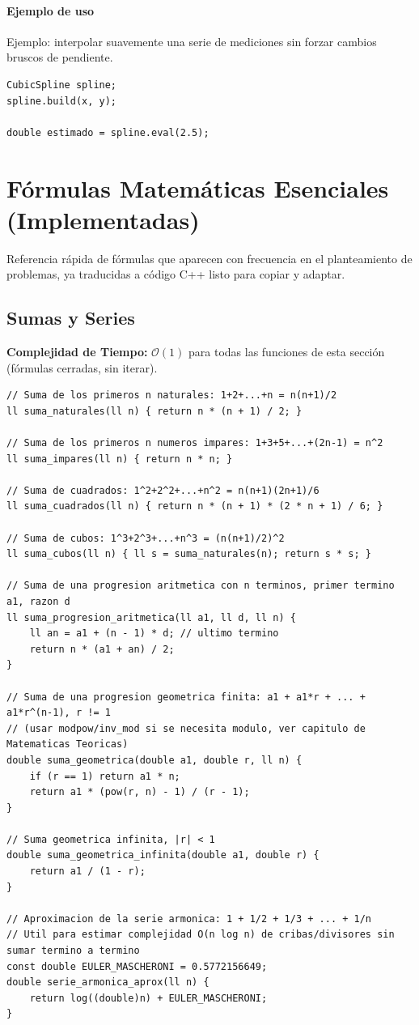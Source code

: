 \documentclass[10pt,twocolumn,letterpaper]{report}
\begin{document}
\subsubsection*{Ejemplo de uso}
Ejemplo: interpolar suavemente una serie de mediciones sin forzar cambios bruscos de pendiente.
\begin{lstlisting}
CubicSpline spline;
spline.build(x, y);

double estimado = spline.eval(2.5);
\end{lstlisting}

\chapter{Fórmulas Matemáticas Esenciales (Implementadas)}
Referencia rápida de fórmulas que aparecen con frecuencia en el planteamiento de problemas, ya traducidas a código C++ listo para copiar y adaptar.

\section{Sumas y Series}
\textbf{Complejidad de Tiempo:} $\mathcal{O}(1)$ para todas las funciones de esta sección (fórmulas cerradas, sin iterar).
\begin{lstlisting}
// Suma de los primeros n naturales: 1+2+...+n = n(n+1)/2
ll suma_naturales(ll n) { return n * (n + 1) / 2; }

// Suma de los primeros n numeros impares: 1+3+5+...+(2n-1) = n^2
ll suma_impares(ll n) { return n * n; }

// Suma de cuadrados: 1^2+2^2+...+n^2 = n(n+1)(2n+1)/6
ll suma_cuadrados(ll n) { return n * (n + 1) * (2 * n + 1) / 6; }

// Suma de cubos: 1^3+2^3+...+n^3 = (n(n+1)/2)^2
ll suma_cubos(ll n) { ll s = suma_naturales(n); return s * s; }

// Suma de una progresion aritmetica con n terminos, primer termino a1, razon d
ll suma_progresion_aritmetica(ll a1, ll d, ll n) {
    ll an = a1 + (n - 1) * d; // ultimo termino
    return n * (a1 + an) / 2;
}

// Suma de una progresion geometrica finita: a1 + a1*r + ... + a1*r^(n-1), r != 1
// (usar modpow/inv_mod si se necesita modulo, ver capitulo de Matematicas Teoricas)
double suma_geometrica(double a1, double r, ll n) {
    if (r == 1) return a1 * n;
    return a1 * (pow(r, n) - 1) / (r - 1);
}

// Suma geometrica infinita, |r| < 1
double suma_geometrica_infinita(double a1, double r) {
    return a1 / (1 - r);
}

// Aproximacion de la serie armonica: 1 + 1/2 + 1/3 + ... + 1/n
// Util para estimar complejidad O(n log n) de cribas/divisores sin sumar termino a termino
const double EULER_MASCHERONI = 0.5772156649;
double serie_armonica_aprox(ll n) {
    return log((double)n) + EULER_MASCHERONI;
}
\end{lstlisting}
\end{document}
